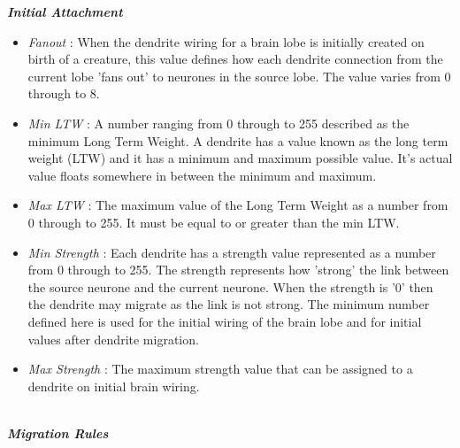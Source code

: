\documentclass[11pt,twoside,a4paper]{article}
\begin{document}
\textbf{\textit{Initial Attachment}}
\begin{itemize}
	\item[] \emph{Fanout} : When the dendrite wiring for a brain lobe is initially created on birth of a creature, this value defines how each dendrite connection from the current lobe 'fans out' to neurones in the source lobe. The value varies from 0 through to 8.
	\item[] \emph{Min LTW} : A number ranging from 0 through to 255 described as the minimum Long Term Weight. A dendrite has a value known as the long term weight (LTW) and it has a minimum and maximum possible value. It's actual value floats somewhere in between the minimum and maximum. %
	\item[] \emph{Max LTW} : The maximum value of the Long Term Weight as a number from 0 through to 255. It must be equal to or greater than the min LTW.~\\
	\item[] \emph{Min Strength} : Each dendrite has a strength value represented as a number from 0 through to 255. The strength represents how 'strong' the link between the source neurone and the current neurone. When the strength is '0' then the dendrite may migrate as the link is not strong. The minimum number defined here is used for the initial wiring of the brain lobe and for initial values after dendrite migration.
	\item[] \emph{Max Strength} : The maximum strength value that can be assigned to a dendrite on initial brain wiring.
\end{itemize}~\\

\textbf{\textit{Migration Rules}}
\end{document}
